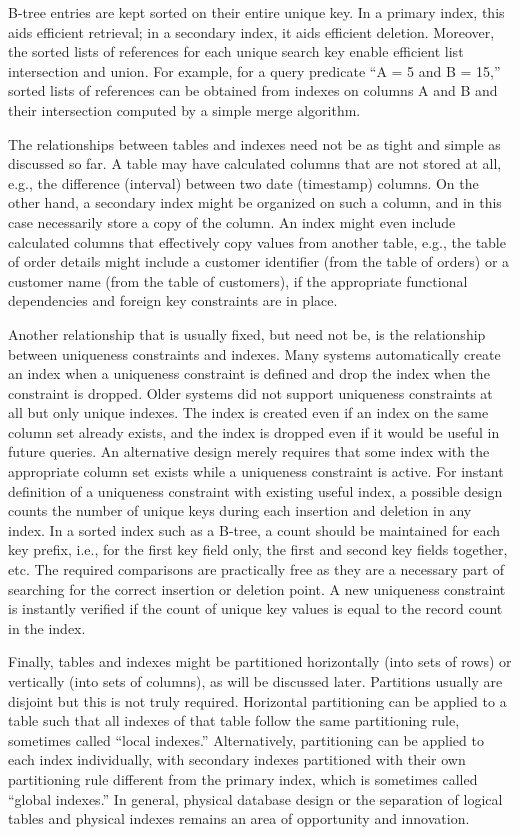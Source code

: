 B-tree entries are kept sorted on their entire unique key. In a primary
index, this aids efficient retrieval; in a secondary index, it aids
efficient deletion. Moreover, the sorted lists of references for each
unique search key enable efficient list intersection and union. For
example, for a query predicate ``A = 5 and B = 15,'' sorted lists of
references can be obtained from indexes on columns A and B and their
intersection computed by a simple merge algorithm.

The relationships between tables and indexes need not be as tight and
simple as discussed so far. A table may have calculated columns that are
not stored at all, e.g., the difference (interval) between two date
(timestamp) columns. On the other hand, a secondary index might be
organized on such a column, and in this case necessarily store a copy of
the column. An index might even include calculated columns that
effectively copy values from another table, e.g., the table of order
details might include a customer identifier (from the table of orders)
or a customer name (from the table of customers), if the appropriate
functional dependencies and foreign key constraints are in place.

Another relationship that is usually fixed, but need not be, is the
relationship between uniqueness constraints and indexes. Many systems
automatically create an index when a uniqueness constraint is defined
and drop the index when the constraint is dropped. Older systems did not
support uniqueness constraints at all but only unique indexes. The index
is created even if an index on the same column set already exists, and
the index is dropped even if it would be useful in future queries. An
alternative design merely requires that some index with the appropriate
column set exists while a uniqueness constraint is active. For instant
definition of a uniqueness constraint with existing useful index, a
possible design counts the number of unique keys during each insertion
and deletion in any index. In a sorted index such as a B-tree, a count
should be maintained for each key prefix, i.e., for the first key field
only, the first and second key fields together, etc. The required
comparisons are practically free as they are a necessary part of
searching for the correct insertion or deletion point. A new uniqueness
constraint is instantly verified if the count of unique key values is
equal to the record count in the index.

Finally, tables and indexes might be partitioned horizontally (into sets
of rows) or vertically (into sets of columns), as will be discussed
later. Partitions usually are disjoint but this is not truly required.
Horizontal partitioning can be applied to a table such that all indexes
of that table follow the same partitioning rule, sometimes called
``local indexes.'' Alternatively, partitioning can be applied to each
index individually, with secondary indexes partitioned with their own
partitioning rule different from the primary index, which is sometimes
called ``global indexes.'' In general, physical database design or the
separation of logical tables and physical indexes remains an area of
opportunity and innovation.

